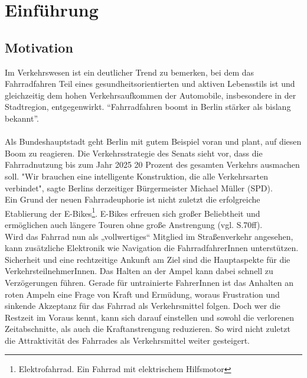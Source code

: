 \chapter{\label{chap:einleitung}Einführung}
\section{Motivation}
Im Verkehrswesen ist ein deutlicher Trend zu bemerken, bei dem das Fahrradfahren Teil eines gesundheitsorientierten und aktiven Lebensstils ist und gleichzeitig dem hohen Verkehrsaufkommen der Automobile, insbesondere in der Stadtregion, entgegenwirkt. “Fahrradfahren boomt in Berlin stärker als bislang bekannt”. \cite{Mopo}\\\\
Als Bundeshauptstadt geht Berlin mit gutem Beispiel voran und plant, auf diesen Boom zu reagieren. Die Verkehrsstrategie des Senats sieht vor, dass die Fahrradnutzung bis zum Jahr 2025 20 Prozent des gesamten Verkehrs ausmachen soll. "Wir brauchen eine intelligente Konstruktion, die alle Verkehrsarten verbindet", sagte Berlins derzeitiger Bürgermeister Michael Müller (SPD). \cite{Mopo}\\
Ein Grund der neuen Fahrradeuphorie ist nicht zuletzt die erfolgreiche Etablierung der E-Bikes\footnote{ Elektrofahrrad. Ein Fahrrad mit elektrischem Hilfsmotor}. E-Bikes erfreuen sich großer Beliebtheit und ermöglichen auch längere Touren ohne große Anstrengung (vgl. \cite{ebikes} S.70ff).\\ 
Wird das Fahrrad nun als „vollwertiges“ Mitglied im Straßenverkehr angesehen, kann zusätzliche Elektronik wie Navigation die FahrradfahrerInnen unterstützen. Sicherheit und eine rechtzeitige Ankunft am Ziel sind die Hauptaspekte für die VerkehrsteilnehmerInnen. Das Halten an der Ampel kann dabei schnell zu Verzögerungen führen. Gerade für untrainierte FahrerInnen ist das Anhalten an roten Ampeln eine Frage von Kraft und Ermüdung, woraus Frustration und sinkende Akzeptanz für das Fahrrad als Verkehrsmittel folgen. Doch wer die Restzeit im Voraus kennt, kann sich darauf einstellen und sowohl die verlorenen Zeitabschnitte, als auch die Kraftanstrengung reduzieren. So wird nicht zuletzt die Attraktivität des Fahrrades als Verkehrsmittel weiter gesteigert. 
